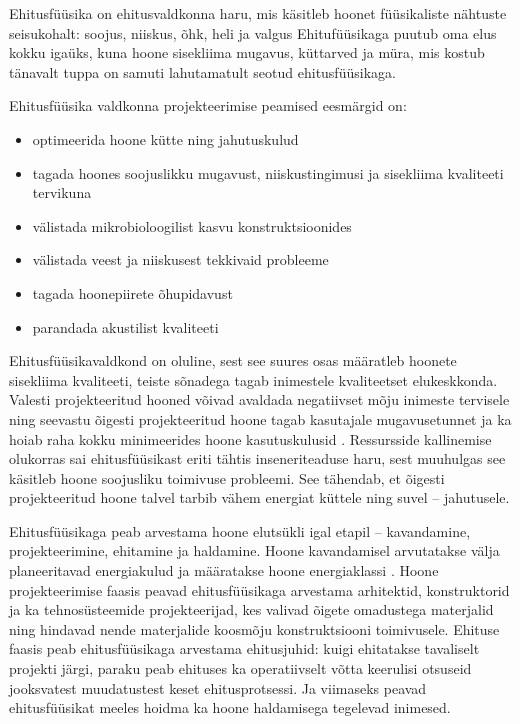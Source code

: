\label{chapters:introduction}
Ehitusfüüsika on ehitusvaldkonna haru, mis käsitleb hoonet füüsikaliste nähtuste seisukohalt: soojus, niiskus, õhk, heli ja valgus
Ehitufüüsikaga puutub oma elus kokku igaüks, kuna hoone sisekliima mugavus, küttarved ja müra, mis kostub tänavalt tuppa
on samuti lahutamatult seotud ehitusfüüsikaga.

Ehitusfüüsika valdkonna projekteerimise peamised eesmärgid on:
\begin{itemize}
    \item optimeerida hoone kütte ning jahutuskulud
    \item tagada hoones soojuslikku mugavust, niiskustingimusi ja sisekliima kvaliteeti tervikuna
    \item välistada mikrobioloogilist kasvu konstruktsioonides
    \item välistada veest ja niiskusest tekkivaid probleeme
    \item tagada hoonepiirete õhupidavust
    \item parandada akustilist kvaliteeti
\end{itemize}

Ehitusfüüsikavaldkond on oluline, sest see suures osas määratleb hoonete sisekliima kvaliteeti, teiste sõnadega tagab inimestele kvaliteetset 
elukeskkonda. Valesti projekteeritud hooned võivad avaldada negatiivset mõju inimeste tervisele \cite{rokka_hygrothermal} ning seevastu õigesti projekteeritud 
hoone tagab kasutajale mugavusetunnet ja ka hoiab raha kokku minimeerides hoone kasutuskulusid \cite{kalamees_phd}. Ressursside kallinemise olukorras sai 
ehitusfüüsikast eriti tähtis inseneriteaduse haru, sest muuhulgas see käsitleb hoone soojusliku toimivuse probleemi. See tähendab, et 
õigesti projekteeritud hoone talvel tarbib vähem energiat küttele ning suvel -- jahutusele.

Ehitusfüüsikaga peab arvestama hoone elutsükli igal etapil -- kavandamine, projekteerimine, ehitamine ja haldamine. Hoone kavandamisel 
arvutatakse välja planeeritavad energiakulud ja määratakse hoone energiaklassi \cite{energia_miinimum}. Hoone projekteerimise faasis peavad ehitusfüüsikaga arvestama arhitektid, 
konstruktorid ja ka tehnosüsteemide projekteerijad, kes valivad õigete omadustega materjalid ning hindavad nende materjalide koosmõju 
konstruktsiooni toimivusele. Ehituse faasis peab ehitusfüüsikaga arvestama ehitusjuhid: kuigi ehitatakse tavaliselt projekti järgi, 
paraku peab ehituses ka operatiivselt võtta keerulisi otsuseid jooksvatest muudatustest keset ehitusprotsessi. Ja viimaseks peavad 
ehitusfüüsikat meeles hoidma ka hoone haldamisega tegelevad inimesed.

